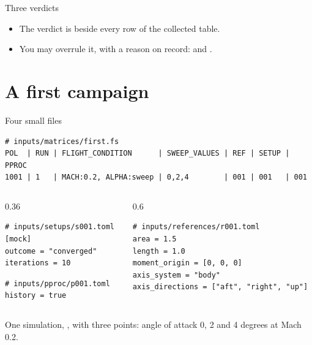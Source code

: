 \begin{frame}{Three verdicts}
\vspace{2mm}
\begin{itemize}\small
  \item The verdict is beside every row of the collected table.
  \item You may overrule it, with a reason on record:
         and .
\end{itemize}
\end{frame}

\section{A first campaign}

\begin{frame}[fragile]{Four small files}
\begin{lstlisting}
# inputs/matrices/first.fs
POL  | RUN | FLIGHT_CONDITION      | SWEEP_VALUES | REF | SETUP | PPROC
1001 | 1   | MACH:0.2, ALPHA:sweep | 0,2,4        | 001 | 001   | 001
\end{lstlisting}
\begin{columns}[T]
\begin{column}{0.36\textwidth}
\begin{lstlisting}[style=cfdbtoml]
# inputs/setups/s001.toml
[mock]
outcome = "converged"
iterations = 10
\end{lstlisting}
\begin{lstlisting}[style=cfdbtoml]
# inputs/pproc/p001.toml
history = true
\end{lstlisting}
\end{column}
\begin{column}{0.6\textwidth}
\begin{lstlisting}[style=cfdbtoml]
# inputs/references/r001.toml
area = 1.5
length = 1.0
moment_origin = [0, 0, 0]
axis_system = "body"
axis_directions = ["aft", "right", "up"]
\end{lstlisting}
\end{column}
\end{columns}
\vspace{1mm}
{\small One simulation, , with three points: angle of attack 0, 2
and 4 degrees at Mach 0.2.\par}
\end{frame}

